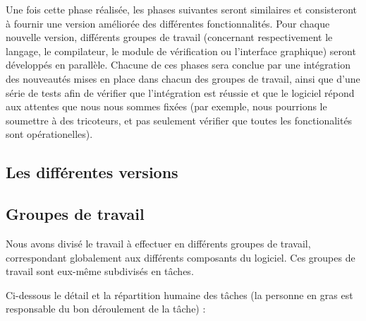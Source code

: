 \documentclass{article}
\begin{document}
Une fois cette phase réalisée, les phases suivantes seront similaires et consisteront à fournir une version améliorée des 
différentes fonctionnalités. Pour chaque nouvelle version, différents groupes de travail (concernant respectivement le langage, le 
compilateur, le module de vérification ou l'interface graphique) seront développés en parallèle. Chacune de ces phases sera conclue 
par une intégration des nouveautés mises en place dans chacun des groupes de travail, ainsi que d'une série de tests afin de vérifier que 
l'intégration est réussie et que le logiciel répond aux attentes que nous nous sommes fixées (par exemple, nous pourrions le soumettre
à des tricoteurs, et pas seulement vérifier que toutes les fonctionalités sont opérationelles).


\subsection{Les différentes versions}


\subsection{Groupes de travail\label{workpackages}}

Nous avons divisé le travail à effectuer en différents groupes de travail, correspondant globalement aux différents composants du 
logiciel. Ces groupes de travail sont eux-même subdivisés en tâches.

Ci-dessous le détail et la répartition humaine des tâches (la personne en gras est responsable du bon déroulement de la tâche) :
\end{document}
